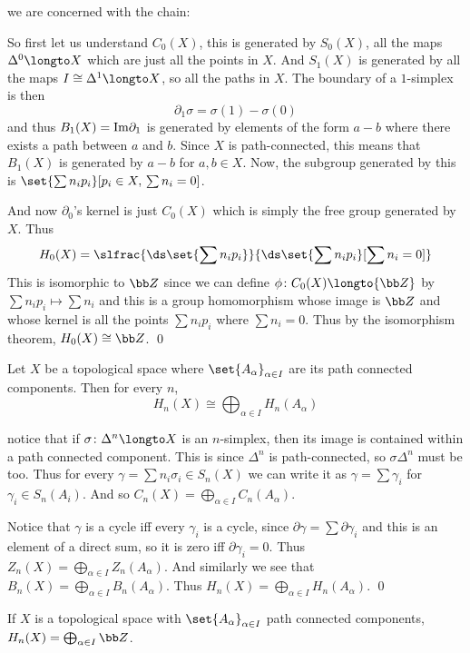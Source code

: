 \Proof we are concerned with the chain:

\bigskip
\centerline{}
\bigskip

So first let us understand $C_0(X)$, this is generated by $S_0(X)$, all the maps $\Delta^0\longto X$ which are just all the points in $X$.
And $S_1(X)$ is generated by all the maps $I\cong\Delta^1\longto X$, so all the paths in $X$.
The boundary of a $1$-simplex is then
$$ \partial_1\sigma = \sigma(1) - \sigma(0) $$
and thus $B_1(X)={\rm Im}\partial_1$ is generated by elements of the form $a-b$ where there exists a path between $a$ and $b$.
Since $X$ is path-connected, this means that $B_1(X)$ is generated by $a-b$ for $a,b\in X$.
Now, the subgroup generated by this is $\set{\sum n_ip_i}[p_i\in X,\,\sum n_i=0]$.

And now $\partial_0$'s kernel is just $C_0(X)$ which is simply the free group generated by $X$.
Thus
$$ H_0(X) = \slfrac{\ds\set{\sum n_ip_i}}{\ds\set{\sum n_ip_i}[\sum n_i=0]} $$
This is isomorphic to ${\bb Z}$ since we can define $\phi\colon C_0(X)\longto{\bb Z}$ by $\sum n_ip_i\mapsto\sum n_i$ and this is a group homomorphism whose image is ${\bb Z}$ and whose kernel is all the
points $\sum n_ip_i$ where $\sum n_i=0$.
Thus by the isomorphism theorem, $H_0(X)\cong{\bb Z}$.
\qed

\bthrm

    Let $X$ be a topological space where $\set{A_\alpha}_{\alpha\in I}$ are its path connected components.
    Then for every $n$,
    $$ H_n(X) \cong \bigoplus_{\alpha\in I}H_n(A_\alpha) $$

\ethrm

\Proof notice that if $\sigma\colon\Delta^n\longto X$ is an $n$-simplex, then its image is contained within a path connected component.
This is since $\Delta^n$ is path-connected, so $\sigma\Delta^n$ must be too.
Thus for every $\gamma=\sum n_i\sigma_i\in S_n(X)$ we can write it as $\gamma=\sum\gamma_i$ for $\gamma_i\in S_n(A_i)$.
And so $C_n(X)=\bigoplus_{\alpha\in I}C_n(A_\alpha)$.

Notice that $\gamma$ is a cycle iff every $\gamma_i$ is a cycle, since $\partial\gamma=\sum\partial\gamma_i$ and this is an element of a direct sum, so it is zero iff $\partial\gamma_i=0$.
Thus $Z_n(X)=\bigoplus_{\alpha\in I}Z_n(A_\alpha)$.
And similarly we see that $B_n(X)=\bigoplus_{\alpha\in I}B_n(A_\alpha)$.
Thus $H_n(X)=\bigoplus_{\alpha\in I}H_n(A_\alpha)$.
\qed

\bcoro

    If $X$ is a topological space with $\set{A_\alpha}_{\alpha\in I}$ path connected components, $H_n(X)=\bigoplus_{\alpha\in I}{\bb Z}$.

\ecoro

